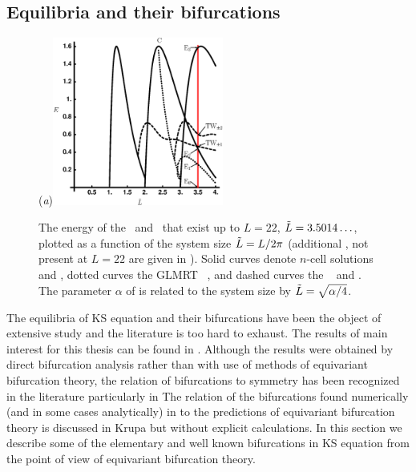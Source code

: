 \subsection{Equilibria and their bifurcations}

\begin{figure}[ht]
\begin{center}
  (\textit{a})\includegraphics[width=0.5\textwidth]{../figs/ksBifDiag.eps}
\end{center}
\caption[KS steady state bifurcations]{
The energy  of the \eqva\ and \reqva\ that
exist up to $L=22$, $\tilde{L} = 3.5014\ldots$, plotted as a function
of the system size $\tilde{L} = L/2\pi$ (additional \eqva, not present
at $L = 22$ are given in ). Solid curves denote
$n$-cell solutions  and , dotted curves the GLMRT
\eqv\ ,
and dashed curves the \reqva\  and .
The parameter $\alpha$ of  is
related to the system size by $\tilde{L}=\sqrt{\alpha/4}$.    }
\label{fig:ksBifDiag}
\end{figure}


The equilibria of KS equation and their bifurcations have been
the object of extensive study and the literature is too hard to
exhaust. The results of main interest for this thesis can be
found in .
Although the results were obtained by direct bifurcation
analysis rather than with use of methods of equivariant
bifurcation theory, the relation of bifurcations to 
symmetry has been recognized in the literature particularly in
 The relation of the bifurcations
found numerically (and in some cases analytically) in
 to the predictions of equivariant bifurcation
theory is discussed in Krupa but
without explicit calculations. In this section we describe some
of the elementary and well known bifurcations in KS equation
from the point of view of equivariant bifurcation theory.

